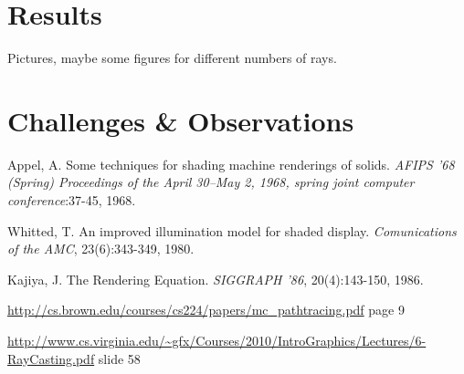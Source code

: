 \documentclass[journal]{IEEEtran}
\begin{document}
\section{Results}
Pictures, maybe some figures for different numbers of rays.

\section{Challenges \& Observations}



\begin{thebibliography}{4}

Appel, A. Some techniques for shading machine renderings of solids. \emph{AFIPS '68 (Spring) Proceedings of the April 30--May 2, 1968, spring joint computer conference}:37-45, 1968.

Whitted, T. An improved illumination model for shaded display. \emph{Comunications of the AMC}, 23(6):343-349, 1980.

Kajiya, J. The Rendering Equation. \emph{SIGGRAPH '86}, 20(4):143-150, 1986.

\url{http://cs.brown.edu/courses/cs224/papers/mc_pathtracing.pdf} page 9

\url{http://www.cs.virginia.edu/~gfx/Courses/2010/IntroGraphics/Lectures/6-RayCasting.pdf} slide 58


\end{thebibliography}

\end{document}
